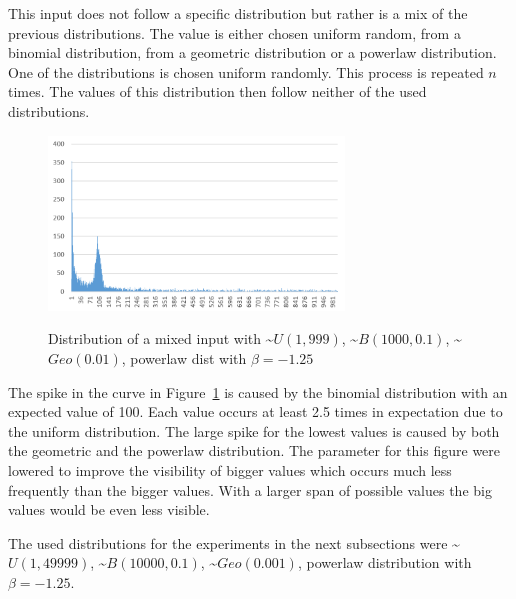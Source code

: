 This input does not follow a specific distribution but rather is a mix of the previous distributions.
The value is either chosen uniform random, from a binomial distribution, from a geometric distribution  or a powerlaw distribution.
One of the distributions is chosen uniform randomly.
This process is repeated $n$ times.
The values of this distribution then follow neither of the used distributions.

\begin{figure}[h]
      \caption{Distribution of a mixed input with \textasciitilde$U(1,999)$, \textasciitilde$B(1000,0.1)$, \textasciitilde$Geo(0.01)$, powerlaw dist with $\beta=-1.25$}
      \centering
      \includegraphics[width=0.7\textwidth]{figures/images/numberGenerator/mixed.png}\label{fig:mixedDistExample}
\end{figure}

The spike in the curve in Figure~\ref{fig:mixedDistExample} is caused by the binomial distribution with an expected value of 100.
Each value occurs at least 2.5 times in expectation due to the uniform distribution.
The large spike for the lowest values is caused by both the geometric and the powerlaw distribution.
The parameter for this figure were lowered to improve the visibility of bigger values which occurs much less frequently than the bigger values.
With a larger span of possible values the big values would be even less visible.

The used distributions for the experiments in the next subsections were \textasciitilde$U(1,49999)$, \textasciitilde$B(10000,0.1)$, \textasciitilde$Geo(0.001)$, powerlaw distribution with $\beta=-1.25$.